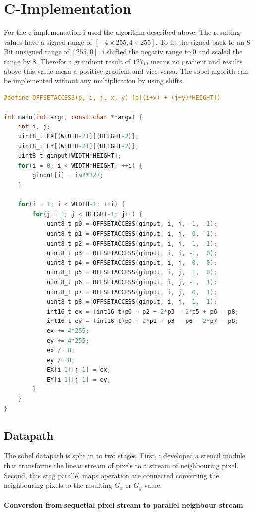 \documentclass[a4paper,fontsize=12pt]{scrartcl}
\begin{document}
\section{C-Implementation}

For the c implementation i used the algorithm described above. The resulting values have a signed range of $[-4\times255, 4\times255]$. To fit the signed back to an 8-Bit unsigned range of $[255,0]$, i shifted the negativ range to $0$ and scaled the range by $8$. Therefor a grandient result of $127_{10}$  means no gradient and results above this value mean a positive gradient and vice versa. The sobel algorith can be implemented without any multiplication by using shifts.

\begin{lstlisting}[language=C]
#define OFFSETACCESS(p, i, j, x, y) (p[(i+x) + (j+y)*HEIGHT])

int main(int argc, const char **argv) {
	int i, j;	
	uint8_t EX[(WIDTH-2)][(HEIGHT-2)];
	uint8_t EY[(WIDTH-2)][(HEIGHT-2)];
	uint8_t ginput[WIDTH*HEIGHT];
	for(i = 0; i < WIDTH*HEIGHT; ++i) {
		ginput[i] = i%2*127;
	}
	
	for(i = 1; i < WIDTH-1; ++i) {
		for(j = 1; j < HEIGHT-1; j++) {
			uint8_t p0 = OFFSETACCESS(ginput, i, j, -1, -1);
			uint8_t p1 = OFFSETACCESS(ginput, i, j,  0, -1);
			uint8_t p2 = OFFSETACCESS(ginput, i, j,  1, -1);
			uint8_t p3 = OFFSETACCESS(ginput, i, j, -1,  0);
			uint8_t p4 = OFFSETACCESS(ginput, i, j,  0,  0);
			uint8_t p5 = OFFSETACCESS(ginput, i, j,  1,  0);
			uint8_t p6 = OFFSETACCESS(ginput, i, j, -1,  1);
			uint8_t p7 = OFFSETACCESS(ginput, i, j,  0,  1);
			uint8_t p8 = OFFSETACCESS(ginput, i, j,  1,  1);
			int16_t ex = (int16_t)p0 - p2 + 2*p3 - 2*p5 + p6 - p8;
			int16_t ey = (int16_t)p0 + 2*p1 + p3 - p6 - 2*p7 - p8;
			ex += 4*255;
			ey += 4*255;
			ex /= 8;
			ey /= 8;
			EX[i-1][j-1] = ex;
			EY[i-1][j-1] = ey;
		}
	}
}
\end{lstlisting}

\subsection{Datapath}

The sobel datapath is split in to two stages. First, i developed a stencil module that transforms the linear stream of pixels to a stream of neighbouring pixel. Second, this stag parallel maps operation are connected converting the neighbouring pixels to the resulting $G_x$ or $G_y$ value.

\paragraph{Conversion from sequetial pixel stream to parallel neighbour stream}
\end{document}
